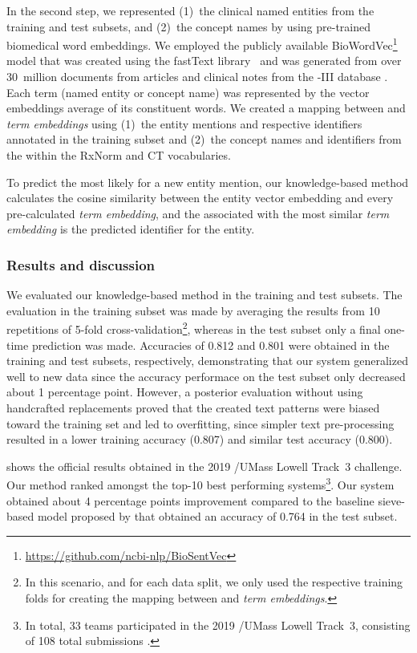 In the second step, we represented (1)~the clinical named entities from the training and test subsets, and (2)~the  concept names by using pre-trained biomedical word embeddings.
We employed the publicly available BioWordVec\footnote{\url{https://github.com/ncbi-nlp/BioSentVec}} model \parencite{chen2019g} that was created using the fastText library~\parencite{bojanowski2017a} and was generated from over 30~million documents from  articles and clinical notes from the -III database \parencite{johnson2016a}.
Each term (named entity or concept name) was represented by the vector embeddings average of its constituent words.
We created a mapping between  and \textit{term embeddings} using (1)~the entity mentions and respective identifiers annotated in the training subset and (2)~the concept names and identifiers from the  within the RxNorm and  CT vocabularies.

To predict the most likely  for a new entity mention, our knowledge-based method calculates the cosine similarity between the entity vector embedding and every pre-calculated \textit{term embedding}, and the  associated with the most similar \textit{term embedding} is the predicted identifier for the entity.


\subsubsection{Results and discussion}

We evaluated our knowledge-based method in the training and test subsets.
The evaluation in the training subset was made by averaging the results from 10 repetitions of 5-fold cross-validation\footnote{In this scenario, and for each data split, we only used the respective training folds for creating the mapping between  and \textit{term embeddings}.}, whereas in the test subset only a final one-time prediction was made.
Accuracies of 0.812 and 0.801 were obtained in the training and test subsets, respectively, demonstrating that our system generalized well to new data since the accuracy performace on the test subset only decreased about 1 percentage point.
However, a posterior evaluation without using handcrafted replacements proved that the created text patterns were biased toward the training set and led to overfitting, since simpler text pre-processing resulted in a lower training accuracy (0.807) and similar test accuracy (0.800).

 shows the official results obtained in the 2019 /UMass Lowell Track~3 challenge.
Our method ranked amongst the top-10 best performing systems\footnote{In total, 33 teams participated in the 2019 /UMass Lowell Track~3, consisting of 108 total submissions \parencite{luo2020b}.}.
Our system obtained about 4 percentage points improvement compared to the baseline sieve-based model proposed by \textcite{luo2019a} that obtained an accuracy of 0.764 in the test subset.

